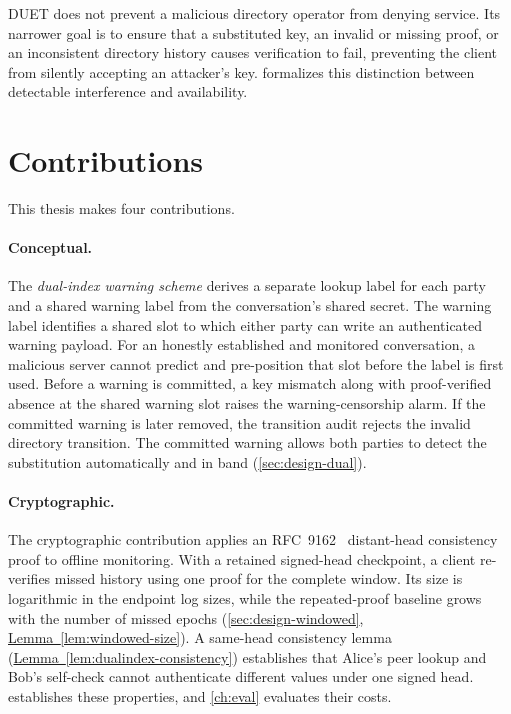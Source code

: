 DUET does not prevent a malicious directory operator from denying service. Its narrower goal is to
ensure that a substituted key, an invalid or missing proof, or an inconsistent directory history
causes verification to fail, preventing the client from silently accepting an attacker's key.
 formalizes this distinction between detectable interference and availability.

\section{Contributions}\label{sec:intro-contributions}

This thesis makes four contributions.

\paragraph{Conceptual.} The \emph{dual-index warning scheme} derives a separate lookup label for each
party and a shared warning label from the conversation's shared secret. The warning label identifies
a shared slot to which either party can write an authenticated warning payload. For an honestly
established and monitored conversation, a malicious server cannot predict and pre-position that
slot before the label is first used. Before a warning is committed, a key mismatch along with
proof-verified absence at the shared warning slot raises the warning-censorship alarm. If the
committed warning is later removed, the transition audit rejects the invalid directory transition.
The committed warning allows both parties to detect the substitution automatically and in band
(\cref{sec:design-dual}).

\paragraph{Cryptographic.} The cryptographic contribution applies an RFC~9162~\cite{rfc9162}
distant-head consistency proof to offline monitoring. With a retained signed-head checkpoint, a client
re-verifies missed history using one proof for the complete window. Its size is logarithmic in the
endpoint log sizes, while the repeated-proof baseline grows with the number of missed epochs
(\cref{sec:design-windowed}, \hyperref[lem:windowed-size]{Lemma~\ref*{lem:windowed-size}}). A same-head consistency lemma (\hyperref[lem:dualindex-consistency]{Lemma~\ref*{lem:dualindex-consistency}}) establishes
that Alice's peer lookup and Bob's self-check cannot authenticate different values under one signed
head.  establishes these properties, and \cref{ch:eval} evaluates their costs.

